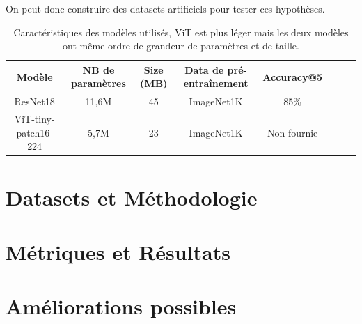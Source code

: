 \documentclass{article}
\begin{document}
On peut donc construire des datasets artificiels pour tester ces hypothèses. \\

\begin{table}[H]
\centering
\begin{tabular}{|c|c|c|c|c|c|c|c|}
\hline
Modèle & NB de paramètres & Size (MB) & Data de pré-entraînement & Accuracy@5 \\
\hline
ResNet18 & 11,6M & 45 & ImageNet1K & 85\% \\
ViT-tiny-patch16-224 & 5,7M & 23 & ImageNet1K & Non-fournie \\
\hline
\end{tabular}
\caption{Caractéristiques des modèles utilisés, ViT est plus léger mais les deux modèles ont même ordre de grandeur de paramètres et de taille.} %
\end{table}

\section{Datasets et Méthodologie}

\section{Métriques et Résultats}

\section{Améliorations possibles}
\end{document}
